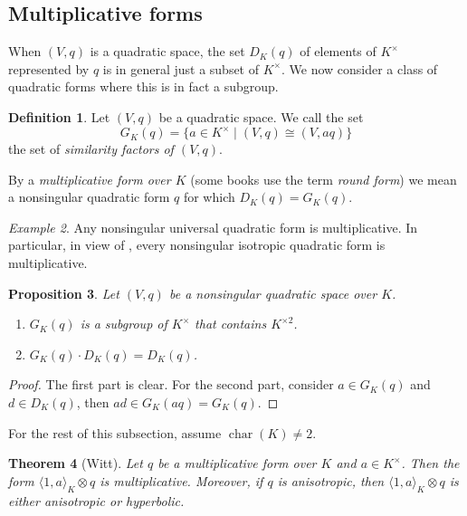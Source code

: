 \documentclass[12pt, leqno, british]{amsart}
\theoremstyle{definition}
\newtheorem{defi}{Definition}[subsection]
\theoremstyle{plain}
\newtheorem{prop}[defi]{Proposition}
\newtheorem{thm}[defi]{Theorem}
\theoremstyle{remark}
\newtheorem{eg}[defi]{Example}
\DeclareMathOperator{\charac}{char}
\begin{document}
\subsection{Multiplicative forms}
When $(V, q)$ is a quadratic space, the set $D_K(q)$ of elements of $K^\times$ represented by $q$ is in general just a subset of $K^\times$.
We now consider a class of quadratic forms where this is in fact a subgroup.
\begin{defi}
Let $(V, q)$ be a quadratic space.
We call the set
$$ G_K(q) = \lbrace a \in K^\times \mid (V, q) \cong (V, aq) \rbrace $$
the set of \emph{similarity factors of $(V, q)$}.

By a \emph{multiplicative form over $K$} (some books use the term \emph{round form}) we mean a nonsingular quadratic form $q$ for which $D_K(q) = G_K(q)$.
\end{defi}
\begin{eg}
Any nonsingular universal quadratic form is multiplicative. In particular, in view of , every nonsingular isotropic quadratic form is multiplicative.
\end{eg}
\begin{prop}\label{P:GKq-properties}
Let $(V, q)$ be a nonsingular quadratic space over $K$.
\begin{enumerate}
\item $G_K(q)$ is a subgroup of $K^\times$ that contains $K^{\times 2}$.
\item $G_K(q) \cdot D_K(q) = D_K(q)$.
\end{enumerate}
\end{prop}
\begin{proof}
The first part is clear.
For the second part, consider $a \in G_K(q)$ and $d \in D_K(q)$, then $ad \in G_K(aq) = G_K(q)$.
\end{proof}
For the rest of this subsection, assume $\charac(K) \neq 2$.
\begin{thm}[Witt]\label{T:Witt-multiplicative-forms}
Let $q$ be a multiplicative form over $K$ and $a \in K^\times$.
Then the form $\langle 1, a \rangle_K \otimes q$ is multiplicative.
Moreover, if $q$ is anisotropic, then $\langle 1, a \rangle_K \otimes q$ is either anisotropic or hyperbolic.
\end{thm}
\end{document}
